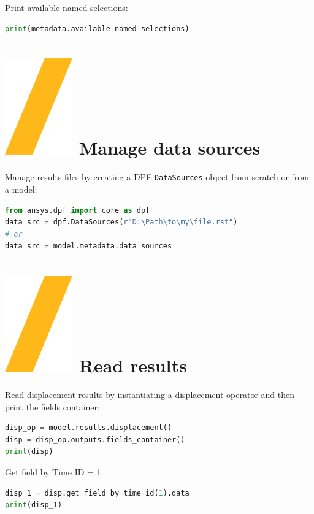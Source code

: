 \documentclass[9pt,landscape]{article}
\begin{document}
\begin{multicols}{3}
Print available named selections:
\begin{lstlisting}[language=Python]
print(metadata.available_named_selections)
\end{lstlisting}


\section{\includegraphics[height=\fontcharht\font`\S]{slash.png} Manage data sources}
Manage results files by creating a DPF \texttt{DataSources} object from scratch or from  a model:
\begin{lstlisting}[language=Python]
from ansys.dpf import core as dpf
data_src = dpf.DataSources(r"D:\Path\to\my\file.rst")
# or
data_src = model.metadata.data_sources
\end{lstlisting}


\section{\includegraphics[height=\fontcharht\font`\S]{slash.png} Read results}
Read displacement results by instantiating a displacement operator and then print the fields container:
\begin{lstlisting}[language=Python]
disp_op = model.results.displacement()
disp = disp_op.outputs.fields_container()
print(disp)
\end{lstlisting}

Get field by Time ID = 1:
\begin{lstlisting}[language=Python]
disp_1 = disp.get_field_by_time_id(1).data
print(disp_1)
\end{lstlisting}


\end{multicols}
\end{document}
